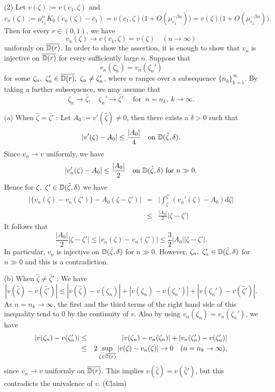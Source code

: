 \noindent
(2) Let $v(\zeta) := v(c_1, \zeta)$ and
$$
  v_n(\zeta) := \mu_{c_1}^nK_0(\check{c}_n(\zeta)-c_1)
= v(c_1,\zeta)\big( 1 + O(\mu_{c_1}^{-\beta n}) \big)
= v(\zeta)\big( 1 + O(\mu_{c_1}^{-\beta n}) \big).
$$
Then for every $r \in (0,1)$, we have
$$
  v_n(\zeta) \to v(c_1,\zeta) = v(\zeta) \quad (n \to \infty) 
$$
uniformly on $\overline{\mathbb D(r)}$. In order to show the assertion, it is 
enough to show that $v_n$ is injective on $\overline{\mathbb D(r)}$ for every
sufficiently large $n$. Suppose that
$$
  v_n(\zeta_n) = v_n(\zeta_n')
$$
for some $\zeta_n, \ \zeta_n' \in \overline{\mathbb D(r)}, \ \zeta_n \ne \zeta_n'$,
where $n$ ranges over a subsequence $\{ n_k \}_{k=1}^\infty$. By taking a
further subsequence, we may assume that
$$
  \zeta_n \to \hat{\zeta}, \quad \zeta_n' \to \hat{\zeta}' \quad \text{ for }
  \ n=n_k, \ k \to \infty.
$$

\noindent
(a) When $\hat{\zeta} = \hat{\zeta}'$ : 
Let $A_0 := v'(\hat{\zeta}) \ne 0$, then there exists a $\delta > 0$
such that
$$
  |v'(\zeta)-A_0| \leq \frac{|A_0|}{4} 
\quad \text{on} \ \mathbb D(\hat{\zeta}, \delta).
$$
Since $v_n \to v$ uniformly, we have
$$
  |v_n'(\zeta)-A_0| \leq \frac{|A_0|}{2} 
\quad \text{on} \ \mathbb D(\hat{\zeta}, \delta) \ \text{for} \ n \gg 0.
$$
Hence for $\zeta, \ \zeta' \in \mathbb D(\hat{\zeta}, \delta)$ we have
\begin{eqnarray*}
\big| \{ v_n(\zeta) - v_n(\zeta') \} - A_0(\zeta-\zeta') \big|
& = &
\Bigg| \int_\zeta^{\zeta'} (v_n'(\zeta) - A_0) d\zeta \Bigg| \\
& \leq &
\frac{|A_0|}{2} |\zeta-\zeta'|
\end{eqnarray*}
It follows that
$$
   \frac{|A_0|}{2} |\zeta-\zeta'|
\leq |v_n(\zeta) - v_n(\zeta')| 
\leq 
\frac 32 |A_0| |\zeta-\zeta'|.
$$
In particular, $v_n$ is injective on $\mathbb D(\hat{\zeta}, \delta)$ for
$n \gg 0$. However, $\zeta_n, \ \zeta_n' \in \mathbb D(\hat{\zeta}, \delta)$ 
for $n \gg 0$ and this is a contradiction.


\noindent
(b) When $\hat{\zeta} \ne \hat{\zeta}'$ : 
We have
$$
  |v(\hat{\zeta}) - v(\hat{\zeta}')| 
\leq |v(\hat{\zeta}) - v(\zeta_n)| 
+|v(\zeta_n) - v(\zeta_n')| 
+|v(\zeta_n') - v(\hat{\zeta}')|.
$$
As $n=n_k \to \infty$, the first and the third terms of the right hand side 
of this inequality tend to $0$ by the continuity of $v$. Also by
using $v_n(\zeta_n) = v_n(\zeta_n')$,  we have
\begin{eqnarray*}
|v(\zeta_n) - v(\zeta_n')| 
& \leq &
|v(\zeta_n) - v_n(\zeta_n)| + |v_n(\zeta_n') - v(\zeta_n')| \\
& \leq &
2 \sup_{\zeta \in \overline{\mathbb D(r)}} |v(\zeta) - v_n(\zeta)| \to 0 \quad
(n=n_k \to \infty), 
\end{eqnarray*}
since $v_n \to v$ uniformly on $\overline{\mathbb D(r)}$. This implies 
$v(\hat{\zeta}) = v(\hat{\zeta}')$, but this contradicts the univalence of
$v$.
\QED (Claim)


